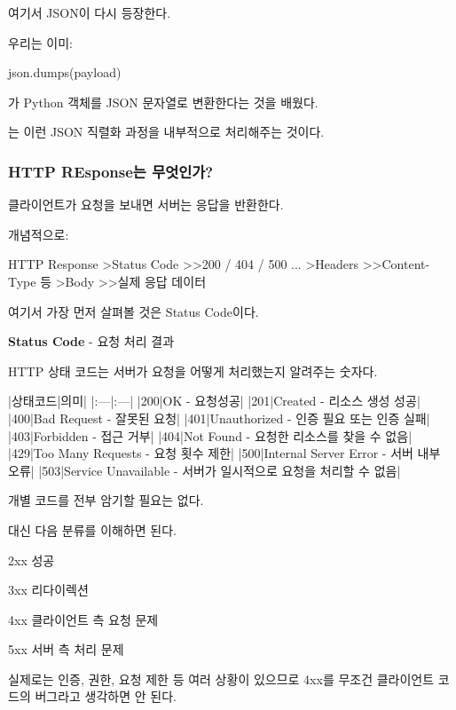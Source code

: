 여기서 JSON이 다시 등장한다.

우리는 이미:

\begin{dhkcode}
json.dumps(payload)
\end{dhkcode}

가 Python 객체를 JSON 문자열로 변환한다는 것을 배웠다.

는 이런 JSON 직렬화 과정을 내부적으로 처리해주는 것이다.

\subsubsection{HTTP REsponse는 무엇인가?}

클라이언트가 요청을 보내면 서버는 응답을 반환한다.

개념적으로:

\begin{dhkdir}[in=6]
HTTP Response
>Status Code
>>200 / 404 / 500 ...
>Headers
>>Content-Type 등
>Body
>>실제 응답 데이터
\end{dhkdir}

여기서 가장 먼저 살펴볼 것은 Status Code이다.

\textbf{Status Code} - 요청 처리 결과

HTTP 상태 코드는 서버가 요청을 어떻게 처리했는지 알려주는 숫자다.

\begin{dhktable}
|상태코드|의미|
|:---|:---|
|200|OK - 요청성공|
|201|Created - 리소스 생성 성공|
|400|Bad Request - 잘못된 요청|
|401|Unauthorized - 인증 필요 또는 인증 실패|
|403|Forbidden - 접근 거부|
|404|Not Found - 요청한 리소스를 찾을 수 없음|
|429|Too Many Requests - 요청 횟수 제한|
|500|Internal Server Error - 서버 내부 오류|
|503|Service Unavailable - 서버가 일시적으로 요청을 처리할 수 없음|
\end{dhktable}

개별 코드를 전부 암기할 필요는 없다.

대신 다음 분류를 이해하면 된다.

\begin{dhksmry}
    2xx \ra 성공

    3xx \ra 리다이렉션

    4xx \ra 클라이언트 측 요청 문제

    5xx \ra 서버 측 처리 문제
\end{dhksmry}

실제로는 인증, 권한, 요청 제한 등 여러 상황이 있으므로 4xx를 무조건 클라이언트 코드의 버그라고 생각하면 안 된다.

